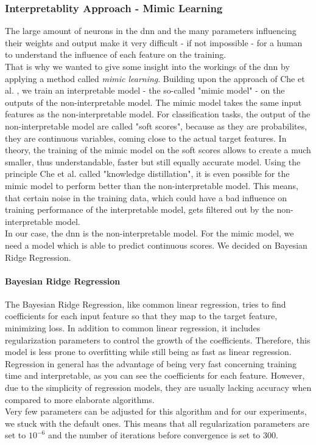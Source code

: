 \documentclass[conference,comsoc]{IEEEtran}
\begin{document}
\subsubsection{Interpretablity Approach - Mimic Learning}
The large amount of neurons in the \gls{dnn} and the many parameters influencing their weights and output make it very difficult - if not impossible - for a human to understand the influence of each feature on the training. \\
That is why we wanted to give some insight into the workings of the \gls{dnn} by applying a method called \emph{mimic learning}. 
Building upon the approach of Che et al. \cite{Che2016}, we train an interpretable model - the so-called "mimic model" - on the outputs of the non-interpretable model.
The mimic model takes the same input features as the non-interpretable model.
For classification tasks, the output of the non-interpretable model are called "soft scores", because as they are probabilites, they are continuous variables, coming close to the actual target features.
In theory, the training of the mimic model on the soft scores allows to create a much smaller, thus understandable, faster but still equally accurate model.
Using the principle Che et al. called "knowledge distillation", it is even possible for the mimic model to perform better than the non-interpretable model.
This means, that certain noise in the training data, which could have a bad influence on training performance of the interpretable model, gets filtered out by the non-interpretable model. \\
In our case, the \gls{dnn} is the non-interpretable model.
For the mimic model, we need a model which is able to predict continuous scores.
We decided on Bayesian Ridge Regression.
\paragraph{Bayesian Ridge Regression}
The Bayesian Ridge Regression, like common linear regression, tries to find coefficients for each input feature so that they map to the target feature, minimizing loss.
In addition to common linear regression, it includes regularization parameters to control the growth of the coefficients.
Therefore, this model is less prone to overfitting while still being as fast as linear regression. \\
Regression in general has the advantage of being very fast concerning training time and interpretable, as you can see the coefficients for each feature.
However, due to the simplicity of regression models, they are usually lacking accuracy when compared to more elaborate algorithms. \\
Very few parameters can be adjusted for this algorithm and for our experiments, we stuck with the default ones.
This means that all regularization parameters are set to $10^{-6}$ and the number of iterations before convergence is set to 300.
\end{document}
